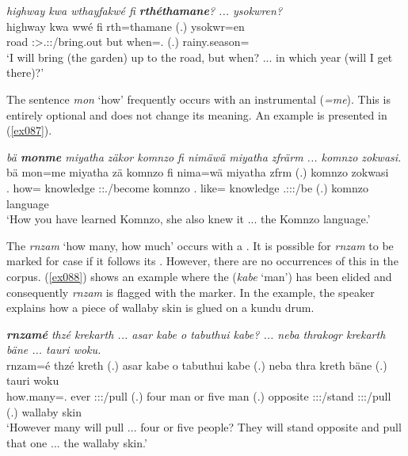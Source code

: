 \begin{exe}
	\ex \emph{highway kwa wthayfakwé fi \textbf{rthéthamane}? ... ysokwren?}\\
	\gll highway kwa wwé fi rth=thamane (.) ysokwr=en\\
	road \Fut{} \Fsg:\Sbj>\Tsg.\F:\Nonpast:\Ipfv/bring.out but when=\Temp{}.\Poss{} (.) rainy.season=\Loc{}\\
	\trans `I will bring (the garden) up to the road, but when? ... in which year (will I get there)?' 
	\label{ex086}
\end{exe}%

The sentence  \emph{mon} `how' frequently occurs with an instrumental  (\emph{=me}). This is entirely optional and does not change its meaning. An example is presented in (\ref{ex087}).

\begin{exe}
	\ex \emph{bä \textbf{monme} miyatha zäkor komnzo fi nimäwä miyatha zfrärm ... komnzo zokwasi.}\\
	\gll bä mon=me miyatha zä komnzo fi nima=wä miyatha zfrm (.) komnzo zokwasi\\
	\Ssg{}.\Abs{} how=\Ins{} knowledge \Stsg:\Sbj:\Rpst.\Pfv/become komnzo \Third{}.\Abs{} like=\Emph{} knowledge \Tsg{}.\F{}:\Sbj:\Pst{}:\Dur{}/be (.) komnzo language\\
	\trans `How you have learned Komnzo, she also knew it ... the Komnzo language.' 
	\label{ex087}
\end{exe}%

The   \emph{rnzam} `how many, how much' occurs with a  . It is possible for \emph{rnzam} to be marked for case if it follows its . However, there are no occurrences of this in the corpus. (\ref{ex088}) shows an example where the   (\emph{kabe} `man') has been elided and consequently \emph{rnzam} is flagged with the   marker. In the example, the speaker explains how a piece of wallaby skin is glued on a kundu drum.

\begin{exe}
	\ex \emph{\textbf{rnzamé} thzé krekarth ... asar kabe o tabuthui kabe? ... neba thrakogr krekarth bäne ... tauri woku.}\\
	\gll rnzam=é thzé kreth (.) asar kabe o tabuthui kabe (.) neba thra kreth bäne (.) tauri woku\\
	how.many=\Erg.\Nsg{} ever \Stpl:\Sbj:\Irr:\Pfv/pull (.) four man or five man (.) opposite \Stpl:\Sbj:\Irr:\Stat/stand \Stpl:\Sbj:\Irr:\Pfv/pull \Recog{} (.) wallaby skin\\
	\trans `However many will pull ... four or five people? They will stand opposite and pull that one ... the wallaby skin.' 
	\label{ex088}
\end{exe}%

